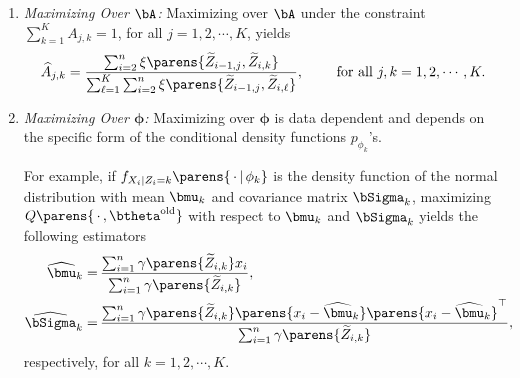 \documentclass[12pt]{article}
\begin{document}
\begin{enumerate}[label=\textbf{\arabic*.}]
\begin{enumerate}
		\item \textit{Maximizing Over $\bA$:} Maximizing over $\bA$ under the constraint $\sum_{k=1}^K A_{j,k} = 1$, for all $j = 1, 2, \cdots, K$, yields 
		\begin{align*}
			\widehat{A}_{j,k} = \frac{\sum_{i=2}^n \xi \parens{\widetilde{Z}_{i-1,j}, \widetilde{Z}_{i,k}}}{\sum_{\ell=1}^K \sum_{i=2}^n \xi \parens{\widetilde{Z}_{i-1,j}, \widetilde{Z}_{i,\ell}}}, \qquad \text{ for all } j, k = 1, 2, \cdots, K. 
		\end{align*}
		
		\item \textit{Maximizing Over $\boldsymbol{\phi}$:} Maximizing over $\boldsymbol{\phi}$ is data dependent and depends on the specific form of the conditional density functions $p_{\phi_k}$'s. 
		
		For example, if $f_{X_i \vert Z_i = k} \parens{\,\cdot \,\vert\, \phi_k}$ is the density function of the normal distribution with mean $\bmu_k$ and covariance matrix $\bSigma_k$, maximizing $Q \parens{\,\cdot\,, \btheta^{\mathrm{old}}}$ with respect to $\bmu_k$ and $\bSigma_k$ yields the following estimators  
		\begin{align*}
			\widehat{\bmu}_k = & \, \frac{\sum_{i=1}^n \gamma \parens{\widetilde{Z}_{i,k}} x_i}{\sum_{i=1}^n \gamma \parens{\widetilde{Z}_{i,k}}}, \\ 
			\widehat{\bSigma}_k = & \, \frac{\sum_{i=1}^n \gamma \parens{\widetilde{Z}_{i,k}} \parens{x_i - \widehat{\bmu}_k} \parens{x_i - \widehat{\bmu}_k}^\top }{\sum_{i=1}^n \gamma \parens{\widetilde{Z}_{i,k}}}, 
		\end{align*}
		respectively, for all $k = 1, 2, \cdots, K$. 
		
	\end{enumerate}
	

\end{enumerate}
\end{document}
